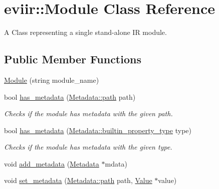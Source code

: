 \hypertarget{classeviir_1_1Module}{}\section{eviir\+:\+:Module Class Reference}
\label{classeviir_1_1Module}


A Class representing a single stand-\/alone IR module.  


\subsection*{Public Member Functions}
\begin{DoxyCompactItemize}
\item 
\hyperlink{classeviir_1_1Module_ab7ce8b6952df04e8c7f4daf6deb37df6}{Module} (string module\+\_\+name)
\item 
\mbox{\label{classeviir_1_1Module_a5467d8522ecb35604210b9637e92fb67}} 
bool \hyperlink{classeviir_1_1Module_a5467d8522ecb35604210b9637e92fb67}{has\+\_\+metadata} (\hyperlink{classeviir_1_1Metadata_ac613e5de0552301f9b7969d14eb5dffa}{Metadata\+::path} path)
\begin{DoxyCompactList}\small\item\em Checks if the module has metadata with the given path. \end{DoxyCompactList}\item 
\mbox{\label{classeviir_1_1Module_a8c2584009d7f44563025dd56e73796de}} 
bool \hyperlink{classeviir_1_1Module_a8c2584009d7f44563025dd56e73796de}{has\+\_\+metadata} (\hyperlink{classeviir_1_1Metadata_a372fe4af91ebc18a6d02354e8bcf23cf}{Metadata\+::builtin\+\_\+property\+\_\+type} type)
\begin{DoxyCompactList}\small\item\em Checks if the module has metadata with the given type. \end{DoxyCompactList}\item 
void \hyperlink{classeviir_1_1Module_a9e4bc38ac7d619c039a0bb0559589399}{add\+\_\+metadata} (\hyperlink{classeviir_1_1Metadata}{Metadata} $\ast$mdata)
\item 
void \hyperlink{classeviir_1_1Module_ad074a2b8807d4d4e2aeefa4c09756a07}{set\+\_\+metadata} (\hyperlink{classeviir_1_1Metadata_ac613e5de0552301f9b7969d14eb5dffa}{Metadata\+::path} path, \hyperlink{classeviir_1_1Value}{Value} $\ast$value)
\item 

\end{DoxyCompactItemize}

